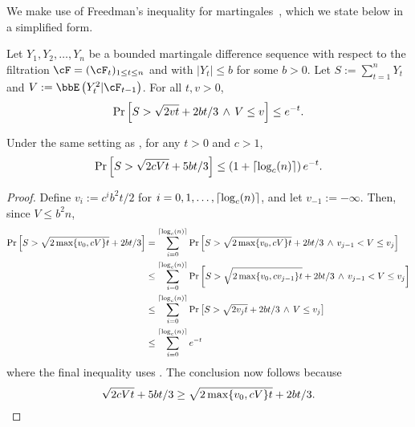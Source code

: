 We make use of Freedman's inequality for martingales~\citep[Theorem
1.6]{Fre75}, which we state below in a simplified form.
\begin{theorem}
  \label{thm:freedman}
  Let $Y_1, Y_2, \dotsc, Y_n$ be a bounded martingale difference
  sequence with respect to the filtration $\cF = (\cF_t)_{1 \leq t
  \leq n}$ and with $|Y_t| \leq b$ for some $b>0$.
  Let $S := \sum_{t=1}^n Y_t$ and $V := \EE{Y_t^2|\cF_{t-1}}$.
  For all $t, v > 0$,
  \[
    \Pr\left[
      S > \sqrt{2vt} + 2bt/3
      \,\wedge\,
      V \leq v
    \right]
    \leq e^{-t}
    .
  \]
\end{theorem}
\begin{corollary}
  \label{cor:freedman}
  Under the same setting as , for any $t > 0$ and
  $c > 1$,
  \[
    \Pr\left[
      S > \sqrt{2cVt} + 5bt/3
    \right]
    \leq
    \left( 1 + \lceil\log_c(n)\rceil \right)
    e^{-t}
    .
  \]
\end{corollary}
\begin{proof}
  Define $v_i := c^i b^2t/2$ for $i = 0, 1, \dotsc, \lceil \log_c(n)
  \rceil$, and let $v_{-1} := -\infty$.
  Then, since $V \leq b^2n$,
  \begin{align*}
    \Pr\left[
      S > \sqrt{2\max\{v_0,cV\}t} + 2bt/3
    \right]
    & =
    \sum_{i=0}^{\lceil\log_c(n)\rceil}
    \Pr\left[
      S > \sqrt{2\max\{v_0,cV\}t} + 2bt/3
      \,\wedge\, v_{j-1} < V \leq v_j
    \right]
    \\
    & \leq
    \sum_{i=0}^{\lceil\log_c(n)\rceil}
    \Pr\left[
      S > \sqrt{2\max\{v_0,cv_{j-1}\}t} + 2bt/3
      \,\wedge\, v_{j-1} < V \leq v_j
    \right]
    \\
    & \leq
    \sum_{i=0}^{\lceil\log_c(n)\rceil}
    \Pr\left[
      S > \sqrt{2v_jt} + 2bt/3
      \,\wedge\, V \leq v_j
    \right]
    \\
    & \leq
    \sum_{i=0}^{\lceil\log_c(n)\rceil}
    e^{-t}
  \end{align*}
  where the final inequality uses .
  The conclusion now follows because
  \[
    \sqrt{2cVt} + 5bt/3
    \geq \sqrt{2\max\{v_0,cV\}t} + 2bt/3
    .
    \qedhere
  \]
\end{proof}

